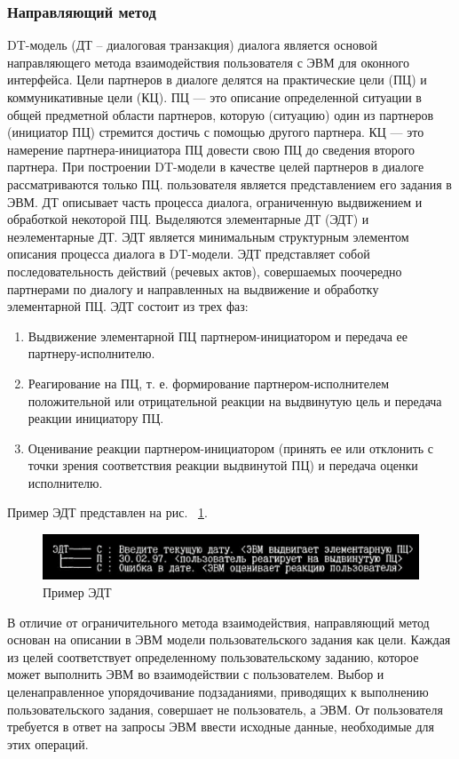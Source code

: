 \subsubsection{Направляющий метод}
	DT-модель (ДТ – диалоговая транзакция) диалога является основой направляющего метода взаимодействия пользователя с ЭВМ для оконного интерфейса. 
	Цели партнеров в диалоге делятся на практические цели (ПЦ) и коммуникативные цели (КЦ). ПЦ — это описание определенной ситуации в общей предметной области партнеров, которую (ситуацию) один из партнеров (инициатор ПЦ) стремится достичь с помощью другого партнера. КЦ — это намерение партнера-инициатора ПЦ довести свою ПЦ до сведения второго партнера. При построении DT-модели в качестве целей партнеров в диалоге рассматриваются только ПЦ. пользователя является представлением его задания в ЭВМ. ДТ описывает часть процесса диалога, ограниченную выдвижением и обработкой некоторой ПЦ. Выделяются элементарные ДТ (ЭДТ) и неэлементарные ДТ. ЭДТ является минимальным структурным элементом описания процесса диалога в DT-модели. ЭДТ представляет собой последовательность действий (речевых актов), совершаемых поочередно партнерами по диалогу и направленных на выдвижение и обработку элементарной ПЦ. ЭДТ состоит из трех фаз:
\begin{enumerate}
	\item Выдвижение элементарной ПЦ партнером-инициатором и передача ее партнеру-исполнителю.
	\item Реагирование на ПЦ, т. е. формирование партнером-исполнителем положительной или отрицательной реакции на выдвинутую цель и передача реакции инициатору ПЦ.
	\item Оценивание реакции партнером-инициатором (принять ее или отклонить с точки зрения соответствия реакции выдвинутой ПЦ) и передача оценки исполнителю.
\end{enumerate}

	Пример ЭДТ представлен на рис. ~\ref{example}.
\begin{figure}[!ht]
  \centering
  \includegraphics[scale=0.35]{ResearchNotes/rndhpc_not_gui_2022_10_10/example.png}
  \caption{Пример ЭДТ}
  \label{example}
\end{figure}

	В отличие от ограничительного метода взаимодействия, направляющий метод основан на описании в ЭВМ модели пользовательского задания как цели. Каждая из целей соответствует определенному пользовательскому заданию, которое может выполнить ЭВМ во взаимодействии с пользователем. Выбор и целенаправленное упорядочивание подзаданиями, приводящих к выполнению пользовательского задания, совершает не пользователь, а ЭВМ. От пользователя требуется в ответ на запросы ЭВМ ввести исходные данные, необходимые для этих операций.

